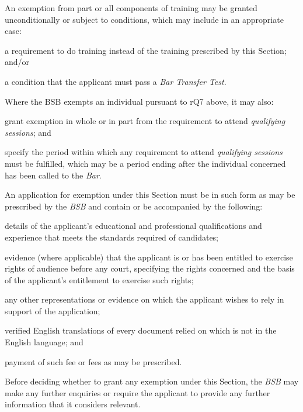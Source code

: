 
An exemption from part or all components of training may be granted
unconditionally or subject to conditions, which may include in an
appropriate case:
\nl
 \item a requirement to do training instead of the training prescribed by
this Section; and/or

 \item a condition that the applicant must pass a \emph{Bar Transfer Test}.
\ln
{}

Where the BSB exempts an individual pursuant to rQ7 above, it may also:
\nl
 \item grant exemption in whole or in part from the requirement to attend
\emph{qualifying sessions}; and

 \item specify the period within which any requirement to attend
\emph{qualifying sessions} must be fulfilled, which may be a period
ending after the individual concerned has been called to the \emph{Bar}.
\ln
{}

An application for exemption under this Section must be in such form as
may be prescribed by the \emph{BSB} and contain or be accompanied by the
following:
\nl
 \item details of the applicant's educational and professional
qualifications and experience that meets the standards required of
candidates;

 \item evidence (where applicable) that the applicant is or has been
entitled to exercise rights of audience before any court, specifying the
rights concerned and the basis of the applicant's entitlement to
exercise such rights;

 \item any other representations or evidence on which the applicant wishes
to rely in support of the application;

 \item verified English translations of every document relied on which is
not in the English language; and

 \item payment of such fee or fees as may be prescribed.\ln


Before deciding whether to grant any exemption under this Section, the
\emph{BSB} may make any further enquiries or require the applicant to
provide any further information that it considers relevant.

